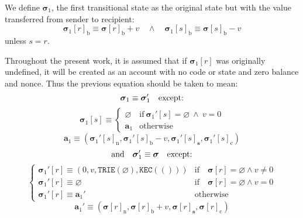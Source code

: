 \documentclass[9pt,oneside]{amsart}
\begin{document}
\begin{multicols}{2}
We define $\boldsymbol{\sigma}_1$, the first transitional state as the original state but with the value transferred from sender to recipient:
\begin{equation}
\boldsymbol{\sigma}_1[r]_{\mathrm{b}} \equiv \boldsymbol{\sigma}[r]_{\mathrm{b}} + v \quad\wedge\quad \boldsymbol{\sigma}_1[s]_{\mathrm{b}} \equiv \boldsymbol{\sigma}[s]_{\mathrm{b}} - v
\end{equation}
unless $s = r$.

Throughout the present work, it is assumed that if $\boldsymbol{\sigma}_1[r]$ was originally undefined, it will be created as an account with no code or state and zero balance and nonce. Thus the previous equation should be taken to mean:
\begin{equation}
\boldsymbol{\sigma}_1 \equiv \boldsymbol{\sigma}_1' \quad \text{except:} \\
\end{equation}
\begin{equation}
\boldsymbol{\sigma}_1[s] \equiv \begin{cases}
\varnothing & \text{if}\ \boldsymbol{\sigma}_1'[s] = \varnothing \ \wedge\ v = 0 \\
\mathbf{a}_1 &\text{otherwise}
\end{cases}
\end{equation}
\begin{equation}
\mathbf{a}_1 \equiv \left(\boldsymbol{\sigma}_1'[s]_{\mathrm{n}}, \boldsymbol{\sigma}_1'[s]_{\mathrm{b}} - v, \boldsymbol{\sigma}_1'[s]_{\mathbf{s}}, \boldsymbol{\sigma}_1'[s]_{\mathrm{c}}\right)
\end{equation}
\begin{equation}
\text{and}\quad \boldsymbol{\sigma}_1' \equiv \boldsymbol{\sigma} \quad \text{except:} \\
\end{equation}
\begin{equation}
\begin{cases}
\boldsymbol{\sigma}_1'[r] \equiv (0, v, \mathtt{TRIE}(\varnothing), \mathtt{KEC}(())) & \text{if} \quad \boldsymbol{\sigma}[r] = \varnothing \wedge v \neq 0 \\
\boldsymbol{\sigma}_1'[r] \equiv \varnothing & \text{if}\quad \boldsymbol{\sigma}[r] = \varnothing \wedge v = 0 \\
\boldsymbol{\sigma}_1'[r] \equiv \mathbf{a}_1' & \text{otherwise}
\end{cases}
\end{equation}
\begin{equation}
\mathbf{a}_1' \equiv (\boldsymbol{\sigma}[r]_{\mathrm{n}}, \boldsymbol{\sigma}[r]_{\mathrm{b}} + v, \boldsymbol{\sigma}[r]_{\mathbf{s}}, \boldsymbol{\sigma}[r]_{\mathrm{c}})
\end{equation}


\end{multicols}
\end{document}
